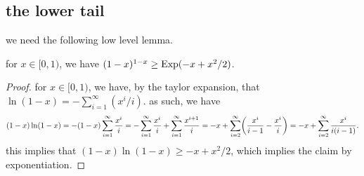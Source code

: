 

\subsection{the lower tail}

we need the following low level lemma.
\begin{lemma}
    for $x \in [0,1)$, we have $(1-x)^{1-x} \geq \mathrm{Exp}( -x + x^2/2)$.
\end{lemma}
\begin{proof}
    for $x \in [0,1)$, we have, by the taylor expansion, that
    $\ln (1-x) = - \sum_{i=1}^\infty ({x^i}/{i})$. as such, we have
    \begin{equation*}
        (1-x)\ln(1-x) %
        =%
        - (1-x) \sum_{i=1}^\infty \frac{x^i}{i}
        =%
        -  \sum_{i=1}^\infty \frac{x^i}{i}
        +  \sum_{i=1}^\infty \frac{x^{i+1}}{i}
        =%
        -x + \sum_{i=2}^\infty \pth{\frac{x^i}{i-1} -\frac{x^i}{i}}%
        =%
        -x + \sum_{i=2}^\infty \frac{x^i}{i(i-1)}.
    \end{equation*}
    this implies that $(1-x)\ln(1-x) \geq -x + x^2/2$, which implies
    the claim by exponentiation.
\end{proof}

